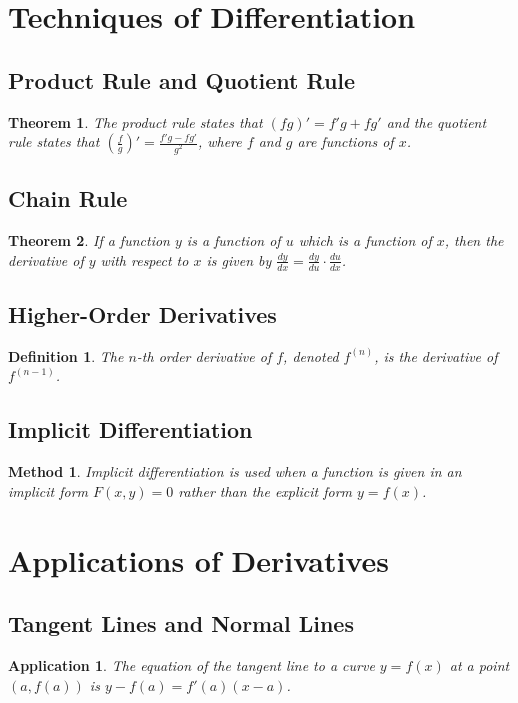 \documentclass[a4paper,12pt]{book}
\newtheorem{theorem}{Theorem}
\newtheorem{application}{Application}
\newtheorem{definition}{Definition}
\newtheorem{method}{Method}
\begin{document}
\section{Techniques of Differentiation}
\subsection{Product Rule and Quotient Rule}
\begin{theorem}
The product rule states that \( (fg)' = f'g + fg' \) and the quotient rule states that \( \left(\frac{f}{g}\right)' = \frac{f'g - fg'}{g^2} \), where \( f \) and \( g \) are functions of \( x \).
\end{theorem}

\subsection{Chain Rule}
\begin{theorem}
If a function \( y \) is a function of \( u \) which is a function of \( x \), then the derivative of \( y \) with respect to \( x \) is given by \( \frac{dy}{dx} = \frac{dy}{du} \cdot \frac{du}{dx} \).
\end{theorem}

\subsection{Higher-Order Derivatives}
\begin{definition}
The \( n \)-th order derivative of \( f \), denoted \( f^{(n)} \), is the derivative of \( f^{(n-1)} \).
\end{definition}

\subsection{Implicit Differentiation}
\begin{method}
Implicit differentiation is used when a function is given in an implicit form \( F(x, y) = 0 \) rather than the explicit form \( y = f(x) \).
\end{method}

\section{Applications of Derivatives}
\subsection{Tangent Lines and Normal Lines}
\begin{application}
The equation of the tangent line to a curve \( y = f(x) \) at a point \( (a, f(a)) \) is \( y - f(a) = f'(a)(x - a) \).
\end{application}
\end{document}
